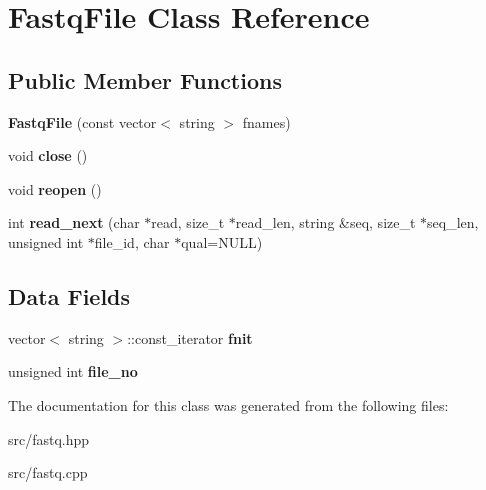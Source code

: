 \hypertarget{classFastqFile}{}\section{Fastq\+File Class Reference}
\label{classFastqFile}
\subsection*{Public Member Functions}
\begin{DoxyCompactItemize}
\item 
\mbox{\label{classFastqFile_a6aff91bc608a4ef874d8664427d9e5d4}} 
{\bfseries Fastq\+File} (const vector$<$ string $>$ fnames)
\item 
\mbox{\label{classFastqFile_a92076bcbedc6990a2b24da15f9536e0f}} 
void {\bfseries close} ()
\item 
\mbox{\label{classFastqFile_ab9ace2ebf774ee9e6d5233f4b6441798}} 
void {\bfseries reopen} ()
\item 
\mbox{\label{classFastqFile_ab562fc010cb9d037e761b6f9662d9378}} 
int {\bfseries read\+\_\+next} (char $\ast$read, size\+\_\+t $\ast$read\+\_\+len, string \&seq, size\+\_\+t $\ast$seq\+\_\+len, unsigned int $\ast$file\+\_\+id, char $\ast$qual=N\+U\+LL)
\end{DoxyCompactItemize}
\subsection*{Data Fields}
\begin{DoxyCompactItemize}
\item 
\mbox{\label{classFastqFile_ac942e8b02e1096ed8af53f27defffb7d}} 
vector$<$ string $>$\+::const\+\_\+iterator {\bfseries fnit}
\item 
\mbox{\label{classFastqFile_a49bb66261b6cb51d75b5c5cc5754361e}} 
unsigned int {\bfseries file\+\_\+no}
\end{DoxyCompactItemize}


The documentation for this class was generated from the following files\+:\begin{DoxyCompactItemize}
\item 
src/fastq.\+hpp\item 
src/fastq.\+cpp\end{DoxyCompactItemize}
